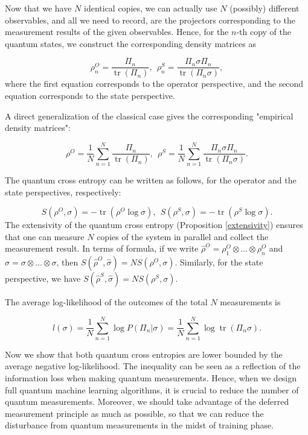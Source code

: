 \documentclass[11pt]{article}
\theoremstyle{definition}
\DeclareMathOperator{\tr}{\text{tr}}
\begin{document}
Now that we have $N$ identical copies, we can actually use $N$ (possibly) different observables, and all we need to record, are the projectors corresponding to the measurement results of the given observables. Hence, for the $n$-th copy of the quantum states, we construct the corresponding density matrices as 

\begin{equation}
    \rho_n^O = \frac{\Pi_n}{\tr(\Pi_n)}, \ \ 
    \rho_n^S = \frac{\Pi_n \sigma \Pi_n}{\tr(\Pi_n \sigma)},
\end{equation}
where the first equation corresponds to the operator perspective, and the second equation corresponds to the state perspective.

A direct generalization of the classical case gives the corresponding "empirical density matrices":

\begin{equation}
    \rho^O = \frac{1}{N}\sum_{n = 1}^N 
    \frac{\Pi_n}{\tr(\Pi_n)}, \ \ 
    \rho^S = \frac{1}{N}\sum_{n = 1}^N 
    \frac{\Pi_n \sigma \Pi_n}{\tr(\Pi_n \sigma)}.
\end{equation}


The quantum cross entropy can be written as follows, for the operator and the state perspectives, respectively:

\begin{equation}
    S(\rho^O, \sigma) = -\tr(\rho^O \log \sigma), \ \ S(\rho^S, \sigma) = -\tr(\rho^S \log \sigma).
\end{equation}
The extensivity of the quantum cross entropy (Proposition \ref{extensivity}) ensures that one can measure $N$ copies of the system in parallel and collect the measurement result. In terms of formula, if we write $\hat \rho^{O}= \rho_1^{O}\otimes...\otimes\rho_n^{O}$ and $\hat \sigma=\sigma\otimes...\otimes\sigma$, then $S(\hat \rho^{O},\hat \sigma)=N S(\rho^O, \sigma)$. Similarly, for the state perspective, we have $S(\hat \rho^{S},\hat \sigma)=N S(\rho^S, \sigma)$. 



The average log-likelihood of the outcomes of the total $N$ measurements is 

\begin{equation}
    l(\sigma)
    = \frac{1}{N} \sum_{n=1}^N \log P(\Pi_n|\sigma)
    = \frac{1}{N} \sum_{n=1}^N \log \tr(\Pi_n \sigma).
\end{equation}

Now we show that both quantum cross entropies are lower bounded by the average negative log-likelihood.
The inequality can be seen as a reflection of the information loss when making quantum measurements.
Hence, when we design full quantum machine learning algorithms, it is crucial to reduce the number of quantum measurements. Moreover, we should take advantage of the deferred measurement principle as much as possible, so that we can reduce the disturbance from quantum measurements in the midst of training phase. 
\end{document}
